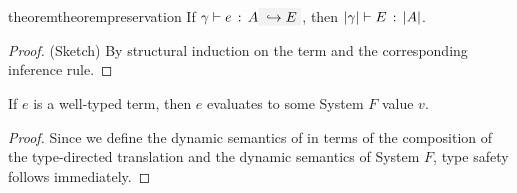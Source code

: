 





\begin{restatable}{theorem}{theorempreservation}
  \label{theorem:preservation}
  If $ \hastype \gamma e A \yields E $,
  then $ \lvert \gamma \rvert \vdash E \ \!:\! \ \lvert A \rvert $.
\end{restatable}
\begin{proof}
(Sketch) By structural induction on the term and the corresponding
inference rule.
\end{proof}

\begin{theorem}
  If $e$ is a well-typed \name term, then $e$ evaluates to some System $F$
  value $v$.
\end{theorem}
\begin{proof}
  Since we define the dynamic semantics of \name in terms of the composition of
  the type-directed translation and the dynamic semantics of System $F$, type safety follows immediately.
\end{proof}
